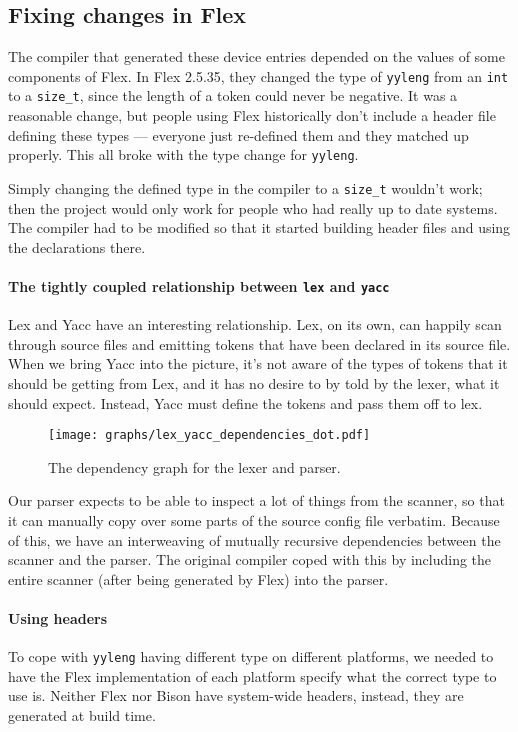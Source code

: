 \documentclass[12pt]{article}
\newcommand{\code}[1]{{\tt #1}}
\begin{document}
\subsection{Fixing changes in Flex}

The compiler that generated these device entries depended on the values of some
components of Flex. In Flex 2.5.35, they changed the type of \code{yyleng} from
an \code{int} to a \code{size\_t}, since the length of a token could never be
negative. It was a reasonable change, but people using Flex historically don't
include a header file defining these types \---- everyone just re-defined them
and they matched up properly. This all broke with the type change for
\code{yyleng}.

Simply changing the defined type in the compiler to a \code{size\_t} wouldn't
work; then the project would only work for people who had really up to date
systems. The compiler had to be modified so that it started building header
files and using the declarations there.

\paragraph{The tightly coupled relationship between \code{lex} and \code{yacc}}
Lex and Yacc have an interesting relationship. Lex, on its own, can happily scan
through source files and emitting tokens that have been declared in its source
file. When we bring Yacc into the picture, it's not aware of the types of
tokens that it should be getting from Lex, and it has no desire to by told by
the lexer, what it should expect. Instead, Yacc must define the tokens and pass
them off to lex.

\begin{figure}
\caption{The dependency graph for the lexer and parser.}
\label{lex-yacc-dependencies}
\texttt{[image: graphs/lex\_yacc\_dependencies\_dot.pdf]}
\end{figure}

Our parser expects to be able to inspect a lot of things from the scanner, so
that it can manually copy over some parts of the source config file verbatim.
Because of this, we have an interweaving of mutually recursive dependencies
between the scanner and the parser. The original compiler coped with this by
including the entire scanner (after being generated by Flex) into the parser.

\paragraph{Using headers}
To cope with \code{yyleng} having different type on different platforms, we
needed to have the Flex implementation of each platform specify what the
correct type to use is. Neither Flex nor Bison have system-wide headers,
instead, they are generated at build time.
\end{document}
